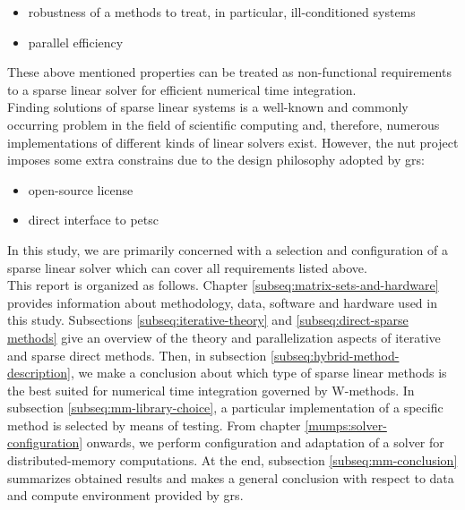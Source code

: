 \begin{itemize}
	\item robustness of a methods to treat, in particular, ill-conditioned systems
	\item parallel efficiency
\end{itemize}


These above mentioned properties can be treated as non-functional requirements to a sparse linear solver for efficient numerical time integration.\\

 
Finding solutions of sparse linear systems is a well-known and commonly occurring problem in the field of scientific computing and, therefore, numerous implementations of different kinds of linear solvers exist. However, the \acrshort{nut} project imposes some extra constrains due to the design philosophy adopted by \acrshort{grs}: \\


\begin{itemize}
	\item open-source license
	\item direct interface to \acrshort{petsc}
\end{itemize}



In this study, we are primarily concerned with a selection and configuration of a  sparse linear solver which can cover all requirements listed above.\\


This report is organized as follows. Chapter \ref{subseq:matrix-sets-and-hardware} provides information about methodology, data, software and hardware used in this study. Subsections \ref{subseq:iterative-theory} and \ref{subseq:direct-sparse methods} give an overview of the theory and parallelization aspects of iterative and sparse direct methods. Then, in subsection \ref{subseq:hybrid-method-description}, we make a conclusion about which type of sparse linear methods is the best suited for numerical time integration governed by W-methods. In subsection 
\ref{subseq:mm-library-choice}, a particular implementation of a specific method is selected by means of testing. From chapter \ref{mumps:solver-configuration} onwards, we perform configuration and adaptation of a solver for distributed-memory computations. At the end, subsection \ref{subseq:mm-conclusion} summarizes obtained results and makes a general conclusion with respect to data and compute environment provided by  \acrshort{grs}.\\




